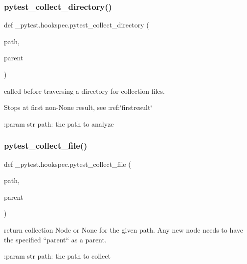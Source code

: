 \subsubsection{\texorpdfstring{pytest\+\_\+collect\+\_\+directory()}{pytest\_collect\_directory()}}
{\footnotesize\ttfamily def \+\_\+pytest.\+hookspec.\+pytest\+\_\+collect\+\_\+directory (\begin{DoxyParamCaption}\item[{}]{path,  }\item[{}]{parent }\end{DoxyParamCaption})}

\begin{DoxyVerb}called before traversing a directory for collection files.

Stops at first non-None result, see :ref:`firstresult`

:param str path: the path to analyze
\end{DoxyVerb}
 \mbox{\label{namespace__pytest_1_1hookspec_adf22f3911f1607ac2e211b5c39dd4c27}} 
\subsubsection{\texorpdfstring{pytest\+\_\+collect\+\_\+file()}{pytest\_collect\_file()}}
{\footnotesize\ttfamily def \+\_\+pytest.\+hookspec.\+pytest\+\_\+collect\+\_\+file (\begin{DoxyParamCaption}\item[{}]{path,  }\item[{}]{parent }\end{DoxyParamCaption})}

\begin{DoxyVerb}return collection Node or None for the given path. Any new node
needs to have the specified ``parent`` as a parent.

:param str path: the path to collect
\end{DoxyVerb}
 \mbox{\label{namespace__pytest_1_1hookspec_af3220d9a97ed54449b489c07d7f3f900}} 
